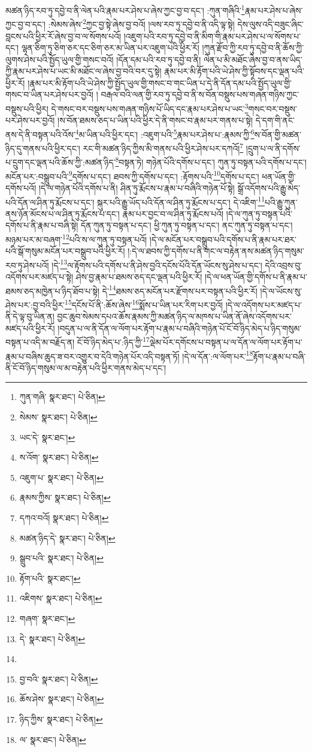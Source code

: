 མཚན་ཉིད་རབ་ཏུ་དབྱེ་བ་ནི་ལེན་པའི་རྣམ་པར་ཤེས་པ་ཞེས་ཀྱང་བྱ་བ་དང་། :ཀུན་གཞིའི་\footnote{ཀུན་གཞི་  སྣར་ཐང་།  པེ་ཅིན། }རྣམ་པར་ཤེས་པ་ཞེས་ཀྱང་བྱ་བ་དང་། :སེམས་ཞེས་\footnote{སེམས་  སྣར་ཐང་།  པེ་ཅིན། }ཀྱང་བྱ་སྟེ་ཞེས་བྱ་བའོ། །ལས་རབ་ཏུ་དབྱེ་བ་ནི་འདི་ལྟ་སྟེ། དེས་ལུས་འདི་བཟུང་ཞིང་བླངས་པའི་ཕྱིར་རོ་ཞེས་བྱ་བ་ལ་སོགས་པའོ། །འཇུག་པའི་རབ་ཏུ་དབྱེ་བ་ནི་མིག་གི་རྣམ་པར་ཤེས་པ་ལ་སོགས་པ་དང་། ལྷན་ཅིག་ཏུ་ཅིག་ཅར་དང་ཅིག་ཅར་མ་ཡིན་པར་འཇུག་པའི་ཕྱིར་རོ། །ཀུན་རྫོབ་ཀྱི་རབ་ཏུ་དབྱེ་བ་ནི་ཆོས་ཀྱི་ལུགས་ཤེས་པའི་སྤྱོད་ཡུལ་གྱི་གསང་བའོ། །དོན་དམ་པའི་རབ་ཏུ་དབྱེ་བ་ནི། ལེན་པ་མི་མཐོང་ཞེས་བྱ་བ་ནས་ཡིད་ཀྱི་རྣམ་པར་ཤེས་པ་ཡང་མི་མཐོང་ལ་ཞེས་བྱ་བའི་བར་དུ་སྟེ། རྣམ་པར་མི་རྟོག་པའི་ཡེ་ཤེས་ཀྱི་སྟོབས་དང་ལྡན་པའི་ཕྱིར་རོ། །རྣམ་པར་མི་རྟོག་པའི་ཡེ་ཤེས་ཀྱི་སྤྱོད་ཡུལ་གྱི་གསང་བ་གང་ཡིན་པ་དེ་ནི་དོན་དམ་པའི་སྤྱོད་ཡུལ་གྱི་གསང་བ་ཡིན་པར་ཤེས་པར་བྱའོ། །
བརྒལ་བའི་ལན་གྱི་རབ་ཏུ་དབྱེ་བ་ནི་ས་བོན་བསྡུས་པས་གཞན་གཉིས་ཀྱང་བསྡུས་པའི་ཕྱིར། དེ་གསང་བར་བསྡུས་པས་གཞན་གཉིས་པོ་ཡིད་དང་རྣམ་པར་ཤེས་པ་ཡང་\footnote{ཡང་དེ་  སྣར་ཐང་། }གསང་བར་བསྡུས་པར་ཤེས་པར་བྱའོ། །ས་བོན་ཐམས་ཅད་པ་ཡིན་པའི་ཕྱིར་དེ་ནི་གསང་བ་རྣམ་པར་གནས་པ་སྟེ། དེ་དག་གི་ནང་ནས་དེ་ནི་བསྟན་པའི་འོས་\footnote{ས་འོག་  སྣར་ཐང་།  པེ་ཅིན། }མ་ཡིན་པའི་ཕྱིར་དང་། :འཇུག་པའི་\footnote{འཇུག་པ་  སྣར་ཐང་།  པེ་ཅིན། }རྣམ་པར་ཤེས་པ་:རྣམས་ཀྱི་\footnote{རྣམས་ཀྱིས་  སྣར་ཐང་།  པེ་ཅིན། }ས་བོན་གྱི་མཚན་ཉིད་དུ་གནས་པའི་ཕྱིར་དང་། རང་གི་མཚན་ཉིད་ཀྱིས་མི་གནས་པའི་ཕྱིར་ཤེས་པར་དཀའོ།\footnote{དཀའ་བའོ།  སྣར་ཐང་།  པེ་ཅིན། } །དྲུག་པ་ལ་ནི་དགོས་པ་དྲུག་དང་ལྡན་པའི་ཆོས་ཀྱི་:མཚན་ཉིད་\footnote{མཚན་ཉིད་དེ་  སྣར་ཐང་།  པེ་ཅིན། }བསྟན་ཏེ། གཉེན་པོའི་དགོས་པ་དང་། ཀུན་ཏུ་བསྟན་པའི་དགོས་པ་དང་། མངོན་པར་:བསྒྲུབ་པའི་\footnote{སྒྲུབ་པའི་  སྣར་ཐང་།  པེ་ཅིན། }དགོས་པ་དང་། ཐབས་ཀྱི་དགོས་པ་དང་། :རྟོགས་པའི་\footnote{རྟོག་པའི་  སྣར་ཐང་། }དགོས་པ་དང་། ཕན་ཡོན་གྱི་དགོས་པའོ། །དེ་ལ་གཉེན་པོའི་དགོས་པ་ནི། ཤིན་ཏུ་རྨོངས་པ་རྣམ་པ་བཞིའི་གཉེན་པོ་སྟེ། སྒྲོ་འདོགས་པའི་རྒྱུ་མེད་པའི་དོན་ལ་ཤིན་ཏུ་རྨོངས་པ་དང་། སྐུར་པའི་རྒྱུ་ཡོད་པའི་དོན་ལ་ཤིན་ཏུ་རྨོངས་པ་དང་། དེ་འཇིག་\footnote{འཇིགས་  སྣར་ཐང་།  པེ་ཅིན། }པའི་རྒྱུ་ཀུན་ནས་ཉོན་མོངས་པ་ལ་ཤིན་ཏུ་རྨོངས་པ་དང་། རྣམ་པར་བྱང་བ་ལ་ཤིན་ཏུ་རྨོངས་པའོ། །དེ་ལ་ཀུན་ཏུ་བསྟན་པའི་དགོས་པ་ནི་རྣམ་པ་བཞི་སྟེ། དོན་ཀུན་ཏུ་བསྟན་པ་དང་། ཕྱི་ཀུན་ཏུ་བསྟན་པ་དང་། ནང་ཀུན་ཏུ་བསྟན་པ་དང་། མཉམ་པར་མ་བཞག་\footnote{གཞག་  སྣར་ཐང་། }པའི་ས་ལ་ཀུན་ཏུ་བསྟན་པའོ། །དེ་ལ་མངོན་པར་བསྒྲུབ་པའི་དགོས་པ་ནི་རྣམ་པར་ཐར་པའི་སྒོ་གསུམ་མངོན་པར་བསྒྲུབ་པའི་ཕྱིར་རོ། །:དེ་ལ་ཐབས་ཀྱི་དགོས་པ་ནི་གང་ལ་བརྟེན་ནས་མཚན་ཉིད་གསུམ་རབ་ཏུ་ཤེས་པའོ། །དེ་\footnote{དེ་  སྣར་ཐང་།  པེ་ཅིན། }ལ་རྟོགས་པའི་དགོས་པ་ནི་ཤེས་བྱའི་དངོས་པོའི་དོན་ཡོངས་སུ་ཤེས་པ་དང་། དེའི་འབྲས་བུ་འདོགས་པར་མཛད་པ་སྟེ། ཤེས་བྱ་རྣམ་པ་ཐམས་ཅད་དང་ལྡན་པའི་ཕྱིར་རོ། །དེ་ལ་ཕན་ཡོན་གྱི་དགོས་པ་ནི་རྣམ་པ་ཐམས་ཅད་མཁྱེན་པ་ཉིད་ཐོབ་པ་སྟེ། དེ་\footnote{}ཐམས་ཅད་མངོན་པར་རྫོགས་པར་བསྟན་པའི་ཕྱིར་རོ། །དེ་ལ་ཡོངས་སུ་ཤེས་པར་:བྱ་བའི་ཕྱིར་\footnote{བྱ་བའི་  སྣར་ཐང་།  པེ་ཅིན། }དངོས་པོ་ནི་:ཆོས་ཞེས་\footnote{ཆོས་ཤེས་  སྣར་ཐང་།  པེ་ཅིན། }སྨོས་པ་ཡིན་པར་རིག་པར་བྱའོ། །དེ་ལ་འདོགས་པར་མཛད་པ་ནི་དེ་ལྟ་བུ་ཡིན་ན། བྱང་ཆུབ་སེམས་དཔའ་ཆོས་རྣམས་ཀྱི་མཚན་ཉིད་ལ་མཁས་པ་ཡིན་ནོ་ཞེས་འདོགས་པར་མཛད་པའི་ཕྱིར་རོ། །བདུན་པ་ལ་ནི་དོན་ལ་ལོག་པར་རྟོག་པ་རྣམ་པ་བཞིའི་གཉེན་པོ་ངོ་བོ་ཉིད་མེད་པ་ཉིད་གསུམ་བསྟན་པ་འདི་མ་བརྗོད་ན། ངོ་བོ་ཉིད་མེད་པ་:ཉིད་ཀྱི་\footnote{ཉིད་ཀྱིས་  སྣར་ཐང་།  པེ་ཅིན། }ལྡེམ་པོར་དགོངས་པ་བསྟན་པ་ལ་དོན་ལ་ལོག་པར་རྟོག་པ་རྣམ་པ་བཞིས་ཆུད་ཟ་བར་འགྱུར་བ་དེའི་གཉེན་པོར་འདི་བསྟན་ཏོ། །དེ་ལ་དོན་:ལ་ལོག་པར་\footnote{ལ་  སྣར་ཐང་།  པེ་ཅིན། }རྟོག་པ་རྣམ་པ་བཞི་ནི་ངོ་བོ་ཉིད་གསུམ་ལ་མ་བརྟེན་པའི་ཕྱིར་གནས་མེད་པ་དང་། 